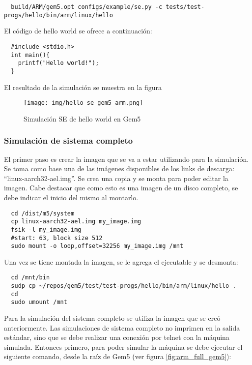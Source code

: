 \documentclass {article}
\begin{document}
\begin{lstlisting}
  build/ARM/gem5.opt configs/example/se.py -c tests/test-progs/hello/bin/arm/linux/hello
\end{lstlisting}

El código de hello world se ofrece a continuación:

\begin{lstlisting}
  #include <stdio.h>
  int main(){
    printf("Hello world!");
  }
\end{lstlisting}

El resultado de la simulación se muestra en la figura %

\begin{figure}[H]
  \centering
  \texttt{[image: img/hello\_se\_gem5\_arm.png]}
  \caption{\label{fig:se_arm} Simulación SE de hello world en Gem5}
\end{figure}

\subsubsection{Simulación de sistema completo}
El primer paso es crear la imagen que se va a estar utilizando para la simulación. Se toma como base
una de las imágenes disponibles de los links de descarga: ``linux-aarch32-ael.img''. Se crea una
copia y se monta para poder editar la imagen. Cabe destacar que como esto es una imagen de un disco
completo, se debe indicar el inicio del mismo al montarlo.

\begin{lstlisting}
  cd /dist/m5/system
  cp linux-aarch32-ael.img my_image.img
  fsik -l my_image.img
  #start: 63, block size 512
  sudo mount -o loop,offset=32256 my_image.img /mnt
\end{lstlisting}

Una vez se tiene montada la imagen, se le agrega el ejecutable y se desmonta:
\begin{lstlisting}
  cd /mnt/bin
  sudp cp ~/repos/gem5/test/test-progs/hello/bin/arm/linux/hello .
  cd
  sudo umount /mnt
\end{lstlisting}

Para la simulación del sistema completo se utiliza la imagen que se creó anteriormente.
Las simulaciones de sistema completo no imprimen en la salida estándar, sino que se
debe realizar una conexión por telnet con la máquina simulada. Entonces primero, para poder simular
la máquina se debe ejecutar el siguiente comando, desde la raíz de Gem5 (ver figura
\ref{fig:arm_full_gem5}):
\end{document}
